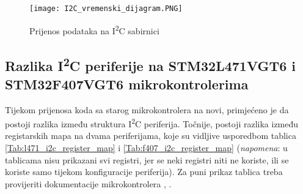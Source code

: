 \begin{figure}[hp]
	\centering
	\texttt{[image: I2C\_vremenski\_dijagram.PNG]}
	\caption{Prijenos podataka na I\textsuperscript{2}C sabirnici \cite{i2c_manual}}
	\label{fig:i2c_timing_diagram_transaction}
\end{figure}

\subsection{Razlika I\textsuperscript{2}C periferije na STM32L471VGT6 i \newline STM32F407VGT6 mikrokontrolerima}

Tijekom prijenosa koda sa starog mikrokontrolera na novi, primjećeno je da postoji razlika između struktura I\textsuperscript{2}C periferija. Točnije, postoji razlika između registarskih mapa na dvama periferijama, koje su vidljive usporedbom tablica \ref{Tab:l471_i2c_register_map} i \ref{Tab:f407_i2c_register_map} (\textit{napomena}: u tablicama nisu prikazani svi registri, jer se neki registri niti ne koriste, ili se koriste samo tijekom konfiguracije periferija). Za puni prikaz tablica treba provijeriti dokumentacije mikrokontrolera \cite{f407_manual}, \citep{l471_manual}.

